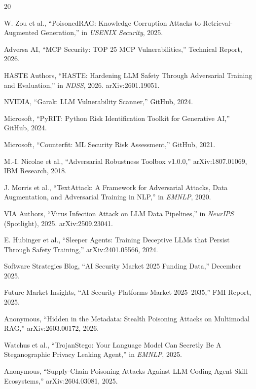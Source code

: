 \documentclass[11pt,twocolumn]{article}
\begin{document}
\begin{thebibliography}{20}

W. Zou et al., ``PoisonedRAG: Knowledge Corruption Attacks to Retrieval-Augmented Generation,'' in \textit{USENIX Security}, 2025.

Adversa AI, ``MCP Security: TOP 25 MCP Vulnerabilities,'' Technical Report, 2026.

HASTE Authors, ``HASTE: Hardening LLM Safety Through Adversarial Training and Evaluation,'' in \textit{NDSS}, 2026. arXiv:2601.19051.

NVIDIA, ``Garak: LLM Vulnerability Scanner,'' GitHub, 2024.

Microsoft, ``PyRIT: Python Risk Identification Toolkit for Generative AI,'' GitHub, 2024.

Microsoft, ``Counterfit: ML Security Risk Assessment,'' GitHub, 2021.

M.-I. Nicolae et al., ``Adversarial Robustness Toolbox v1.0.0,'' arXiv:1807.01069, IBM Research, 2018.

J. Morris et al., ``TextAttack: A Framework for Adversarial Attacks, Data Augmentation, and Adversarial Training in NLP,'' in \textit{EMNLP}, 2020.

VIA Authors, ``Virus Infection Attack on LLM Data Pipelines,'' in \textit{NeurIPS} (Spotlight), 2025. arXiv:2509.23041.

E. Hubinger et al., ``Sleeper Agents: Training Deceptive LLMs that Persist Through Safety Training,'' arXiv:2401.05566, 2024.

Software Strategies Blog, ``AI Security Market 2025 Funding Data,'' December 2025.

Future Market Insights, ``AI Security Platforms Market 2025--2035,'' FMI Report, 2025.

Anonymous, ``Hidden in the Metadata: Stealth Poisoning Attacks on Multimodal RAG,'' arXiv:2603.00172, 2026.

Watchus et al., ``TrojanStego: Your Language Model Can Secretly Be A Steganographic Privacy Leaking Agent,'' in \textit{EMNLP}, 2025.

Anonymous, ``Supply-Chain Poisoning Attacks Against LLM Coding Agent Skill Ecosystems,'' arXiv:2604.03081, 2025.

\end{thebibliography}
\end{document}
